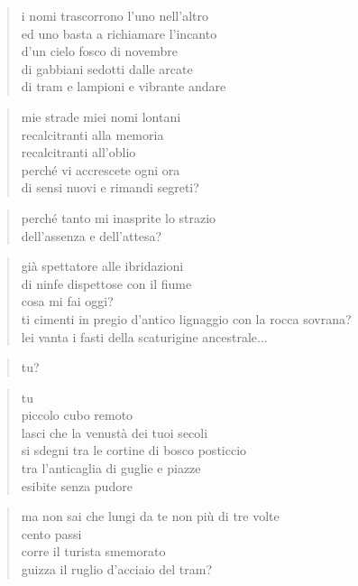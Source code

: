 	\begin{verse}
		i nomi trascorrono l'uno nell'altro\\
		ed uno basta a richiamare l'incanto\\
		d'un cielo fosco di novembre\\
		di gabbiani sedotti dalle arcate\\
		di tram e lampioni e vibrante andare
	\end{verse}

	\begin{verse}
		mie strade miei nomi lontani\\
		recalcitranti alla memoria\\
		recalcitranti all'oblio\\
		perché vi accrescete ogni ora\\
		di sensi nuovi e rimandi segreti?
	\end{verse}

	\begin{verse}
		perché tanto mi inasprite lo strazio\\
		dell'assenza e dell'attesa?
	\end{verse}

\clearpage


	\begin{verse}
		già spettatore alle ibridazioni\\
		di ninfe dispettose con il fiume\\
		cosa mi fai oggi?\\
		ti cimenti in pregio d'antico lignaggio con la rocca sovrana?\\
		lei vanta i fasti della scaturigine ancestrale...
	\end{verse}

	\begin{verse}
		tu?
	\end{verse}

	\begin{verse}
		tu\\
		piccolo cubo remoto\\
		lasci che la venustà dei tuoi secoli\\
		si sdegni tra le cortine di bosco posticcio\\
		tra l’anticaglia di guglie e piazze\\
		esibite senza pudore
	\end{verse}

	\begin{verse}
		ma non sai che lungi da te non più di tre volte\\
		cento passi\\
		corre il turista smemorato\\
		guizza il ruglio d'acciaio del tram?
	\end{verse}

